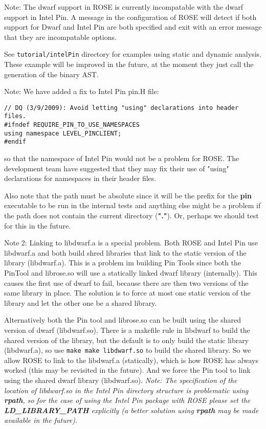 Note: The dwarf support in ROSE is currently incompatable with the dwarf support in
Intel Pin.  A message in the configuration of ROSE will detect if both support for
Dwarf and Intel Pin are both specified and exit with an error message that they
are incompatable options.

See {\tt tutorial/intelPin} directory for examples using static and dynamic analysis.
These example will be improved in the future, at the moment they just call the
generation of the binary AST.


Note: We have added a fix to Intel Pin pin.H file:
\begin{verbatim}
// DQ (3/9/2009): Avoid letting "using" declarations into header files.
#ifndef REQUIRE_PIN_TO_USE_NAMESPACES
using namespace LEVEL_PINCLIENT;
#endif
\end{verbatim}
so that the namespace of Intel Pin would not be a problem for ROSE.
The development team have suggested that they may fix their use of "using" 
declarations for namespaces in their header files.

Also note that the path must be absolute since it will be the
prefix for the {\bf pin} executable to be run in the internal tests and
anything else might be a problem if the path does not contain the 
current directory ({\bf "."}). Or, perhaps we should test for this
in the future.

Note 2: Linking to libdwarf.a is a special problem.  
Both ROSE and Intel Pin use libdwarf.a and both build shred libraries 
that link to the static version of the library (libdwarf.a).  This is 
a problem im building Pin Tools since both the PinTool and librose.so will use 
a statically linked dwarf library (internally).  This causes the first
use of dwarf to fail, because there are then two versions of the same 
library in place.  The solution is to force at most one static version 
of the library and let the other one be a shared library.

   Alternatively both the Pin tool and librose.so can be
built using the shared version of dwarf (libdwarf.so).
There is a makefile rule in libdwarf to build the shared
version of the library, but the default is to only build the
static library (libdwarf.a), so use {\tt make make libdwarf.so}
to build the shared library.  So we allow ROSE to link to
the libdwarf.a (statically), which is how ROSE has always
worked (this may be revisited in the future).  And we force 
the Pin tool to link using the shared dwarf library (libdwarf.so).
{\em Note: The specification of the location of libdwarf.so in the Intel Pin 
directory structure is problematic using {\bf rpath}, so for the case of 
using the Intel Pin package with ROSE please set the {\bf LD\_LIBRARY\_PATH}
explicitly (a better solution using {\bf rpath} may be made available in 
the future).}


